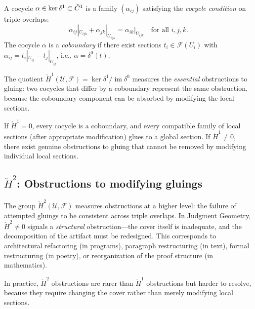 \begin{proposition}
\label{prop:h1-obstructions}
A cocycle $\alpha \in \ker \delta^1 \subset \check{C}^1$ is a family
$(\alpha_{ij})$ satisfying the \emph{cocycle condition} on triple overlaps:
\[
  \alpha_{ij}|_{U_{ijk}} + \alpha_{jk}|_{U_{ijk}} = \alpha_{ik}|_{U_{ijk}}
  \quad \text{for all } i, j, k.
\]
The cocycle $\alpha$ is a \emph{coboundary} if there exist sections
$t_i \in \mathcal{F}(U_i)$ with $\alpha_{ij} = t_i|_{U_{ij}} - t_j|_{U_{ij}}$,
i.e., $\alpha = \delta^0(t)$.

The quotient $\check{H}^1(\mathcal{U}, \mathcal{F})
= \ker \delta^1 / \operatorname{im} \delta^0$ measures the
\emph{essential} obstructions to gluing: two cocycles that differ by a
coboundary represent the same obstruction, because the coboundary
component can be absorbed by modifying the local sections.

If $\check{H}^1 = 0$, every cocycle is a coboundary, and every
compatible family of local sections (after appropriate modification)
glues to a global section.  If $\check{H}^1 \neq 0$, there exist
genuine obstructions to gluing that cannot be removed by modifying
individual local sections.
\end{proposition}

\subsection{\texorpdfstring{$\check{H}^2$}{H2}: Obstructions to modifying gluings}
\label{sec:cech:h2}

\begin{remark}
\label{rem:h2}
The group $\check{H}^2(\mathcal{U}, \mathcal{F})$ measures obstructions
at a higher level: the failure of attempted gluings to be consistent
across triple overlaps.  In Judgment Geometry, $\check{H}^2 \neq 0$
signals a \emph{structural} obstruction---the cover itself is
inadequate, and the decomposition of the artifact must be redesigned.
This corresponds to architectural refactoring (in programs), paragraph
restructuring (in text), formal restructuring (in poetry), or
reorganization of the proof structure (in mathematics).

In practice, $\check{H}^2$ obstructions are rarer than $\check{H}^1$
obstructions but harder to resolve, because they require changing the
cover rather than merely modifying local sections.
\end{remark}




